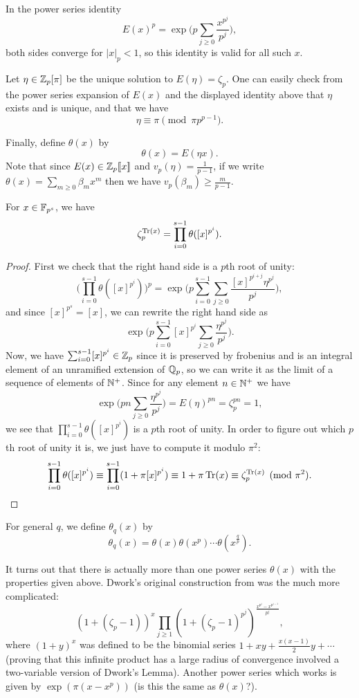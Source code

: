 In the power series identity
\[
E(x)^p = \exp\Big(p\sum_{j \ge 0} \frac{x^{p^j}}{p^j}\Big),
\]
both sides converge for $|x|_p < 1$, so this identity is valid for all such $x$.

Let $\eta \in \mathbb{Z}_p[\pi]$ be the unique solution to $E(\eta) = \zeta_p$. One can easily check from the power series expansion of $E(x)$ and the displayed identity above that $\eta$ exists and is unique, and that we have
\[
\eta \equiv \pi \pmod{\pi p^{p-1}}.
\]

Finally, define $\theta(x)$ by
\[
\theta(x) = E(\eta x).
\]
Note that since $E(x) \in \mathbb{Z}_p[\![x]\!]$ and $v_p(\eta) = \frac{1}{p-1}$, if we write $\theta(x) = \sum_{m \ge 0} \beta_m x^m$ then we have $v_p(\beta_m) \ge \frac{m}{p-1}$.

\begin{lem} For $x \in \mathbb{F}_{p^s}$, we have
\[
\zeta_p^{\operatorname{Tr}(x)} = \prod_{i=0}^{s-1} \theta([x]^{p^i}).
\]
\end{lem}
\begin{proof} First we check that the right hand side is a $p$th root of unity:
\[
\Big(\prod_{i=0}^{s-1} \theta([x]^{p^i})\Big)^p = \exp\Big(p\sum_{i=0}^{s-1}\sum_{j \ge 0} \frac{[x]^{p^{i+j}}\eta^{p^j}}{p^j}\Big),
\]
and since $[x]^{p^s} = [x]$, we can rewrite the right hand side as
\[
\exp\Big(p\sum_{i=0}^{s-1} [x]^{p^i}\sum_{j \ge 0} \frac{\eta^{p^j}}{p^j}\Big).
\]
Now, we have $\sum_{i=0}^{s-1} [x]^{p^i} \in \mathbb{Z}_p$ since it is preserved by frobenius and is an integral element of an unramified extension of $\mathbb{Q}_p$, so we can write it as the limit of a sequence of elements of $\mathbb{N}^+$. Since for any element $n \in \mathbb{N}^+$ we have
\[
\exp\Big(pn\sum_{j \ge 0} \frac{\eta^{p^j}}{p^j}\Big) = E(\eta)^{pn} = \zeta_p^{pn} = 1,
\]
we see that $\prod_{i=0}^{s-1} \theta([x]^{p^i})$ is a $p$th root of unity. In order to figure out which $p$th root of unity it is, we just have to compute it modulo $\pi^2$:
\[
\prod_{i=0}^{s-1} \theta([x]^{p^i}) \equiv \prod_{i=0}^{s-1} (1 + \pi[x]^{p^i}) \equiv 1 + \pi\operatorname{Tr}(x) \equiv \zeta_p^{\operatorname{Tr}(x)} \pmod{\pi^2}.\qedhere
\]
\end{proof}

For general $q$, we define $\theta_q(x)$ by
\[
\theta_q(x) = \theta(x) \theta(x^p) \cdots \theta(x^{\tfrac{q}{p}}).
\]

It turns out that there is actually more than one power series $\theta(x)$ with the properties given above. Dwork's original construction from \cite{dwork} was the much more complicated:
\[
(1+(\zeta_p-1))^x\prod_{j \ge 1} (1+(\zeta_p-1)^{p^j})^{\frac{x^{p^j} - x^{p^{j-1}}}{p^j}},
\]
where $(1+y)^x$ was defined to be the binomial series $1 + xy + \frac{x(x-1)}{2}y + \cdots$ (proving that this infinite product has a large radius of convergence involved a two-variable version of Dwork's Lemma). Another power series which works is given by $\exp(\pi(x-x^p))$ (is this the same as $\theta(x)$?).

